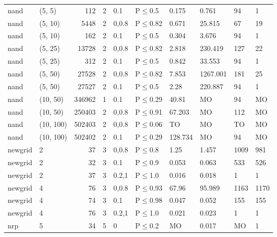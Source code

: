 \begin{longtable}{llrrllllll}
 nand          & (5, 5)    &    	112 &   2 & 0.1   & P$\leq$0.5   & 0.175   & 0.761    & 94     & 1      \\
 nand          & (5, 10)   &   	5448 &   2 & 0,0.8 & P$\leq$0.82  & 0.671   & 25.815   & 67     & 19     \\
 nand          & (5, 10)   &    	162 &   2 & 0.1   & P$\leq$0.5   & 0.304   & 3.676    & 94     & 1      \\
 nand          & (5, 25)   &  	13728 &   2 & 0,0.8 & P$\leq$0.82  & 2.818   & 230.419  & 127    & 22     \\
 nand          & (5, 25)   &    	312 &   2 & 0.1   & P$\leq$0.5   & 0.842   & 33.553   & 94     & 1      \\
 nand          & (5, 50)   &  	27528 &   2 & 0,0.8 & P$\leq$0.82  & 7.853   & 1267.001 & 181    & 25     \\
 nand          & (5, 50)   &  	27527 &   2 & 0.1   & P$\leq$0.5   & 2.28    & 220.887  & 94     & 1      \\
 nand          & (10, 50)  & 	346962 &   1 & 0.1   & P$\leq$0.29  & 40.81   & MO       & 94     & MO     \\
 nand          & (10, 50)  & 	250403 &   2 & 0,0.8 & P$\leq$0.91  & 67.203  & MO       & 112    & MO     \\
 nand          & (10, 100) & 	502403 &   2 & 0,0.8 & P$\leq$0.06  & TO      & MO       & TO     & MO     \\
 nand          & (10, 100) & 	502402 &   2 & 0.1   & P$\leq$0.29  & 128.734 & MO       & 94     & MO     \\
 newgrid       & 2         &     	37 &   3 & 0,0.8 & P$\leq$0.8   & 1.25    & 1.457    & 1009   & 981    \\
 newgrid       & 2         &     	32 &   3 & 0.1   & P$\leq$0.9   & 0.053   & 0.063    & 533    & 526    \\
 newgrid       & 2         &     	37 &   3 & 0.2,1 & P$\leq$1.0   & 0.016   & 0.018    & 1      & 1      \\
 newgrid       & 4         &     	76 &   3 & 0,0.8 & P$\leq$0.93  & 67.96   & 95.989   & 1163   & 1170   \\
 newgrid       & 4         &     	74 &   3 & 0.1   & P$\leq$0.98  & 0.047   & 0.052    & 155    & 155    \\
 newgrid       & 4         &     	76 &   3 & 0.2,1 & P$\leq$1.0   & 0.021   & 0.023    & 1      & 1      \\
 nrp           & 5         &     	34 &   5 & 0     & P$\leq$0.2   & MO      & 0.017    & MO     & 1      \\

\end{longtable}
